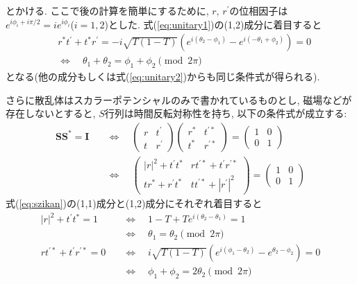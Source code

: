 \documentclass[10pt,a4j]{jarticle}
\begin{document}
とかける. ここで後の計算を簡単にするために, $r$, $r^{\prime}$の位相因子は
$e^{i \phi_i + i\pi/2} = i e^{i \phi_i}$($i=1,2$)とした. 式(\ref{eq:unitary1})の(1,2)成分に着目すると
\begin{align}
& r^{*}t^{\prime}  +   t^{*} r^{\prime} = -i\sqrt{T(1-T)} (e^{i(\theta_2 - \phi_1)} - e^{i(-\theta_1 + \phi_2)} )  =0  \nonumber \\
&\Longleftrightarrow \quad \theta_1 + \theta_2 = \phi_1 + \phi_2 \pmod{2 \pi}
\end{align}
となる(他の成分もしくは式(\ref{eq:unitary2})からも同じ条件式が得られる).

さらに散乱体はスカラーポテンシャルのみで書かれているものとし, 
磁場などが存在しないとすると, $S$行列は時間反転対称性を持ち, 以下の条件式が成立する:
\begin{align}
\bm{S} \bm{S}^{*} = \bm{I} \quad &\Longleftrightarrow \quad
\left( \begin{array}{cc} r & t^{\prime} \\ t & r^{\prime} \end{array} \right) 
\left( \begin{array}{cc} r^{*} & t^{\prime *} \\ t^{*} & r^{\prime *} \end{array} \right) 
= \left( \begin{array}{cc} 1 & 0  \\ 0 & 1 \end{array} \right)  \nonumber \\
& \Longleftrightarrow \quad 
\left( \begin{array}{cc} |r|^2 + t^{\prime}t^{*} & rt^{\prime *} + t^{\prime} r^{\prime *}\\
        t r^{*} + r^{\prime}t^{*}& tt^{\prime*} + |r^{\prime }|^2  \end{array} \right) 
= \left( \begin{array}{cc} 1 & 0  \\ 0 & 1 \end{array} \right) 
\label{eq:szikan}
\end{align}
式(\ref{eq:szikan})の(1,1)成分と(1,2)成分にそれぞれ着目すると
\begin{align}
 |r|^2 + t^{\prime}t^{*} = 1 \quad &\Longleftrightarrow \quad 1-T + Te^{i(\theta_2 - \theta_1)} = 1 \nonumber \\
 & \Longleftrightarrow \quad \theta_1 = \theta_2 \pmod{2\pi}\\
 rt^{\prime *} + t^{\prime} r^{\prime *} = 0 \quad &\Longleftrightarrow 
 \quad i\sqrt{T(1-T)}(e^{i(\phi_1 - \theta_2)} - e^{\theta_2 - \phi_2}) = 0 \nonumber \\
 & \Longleftrightarrow \quad \phi_1 + \phi_2 = 2\theta_2 \pmod{2\pi}
\end{align}
\end{document}
